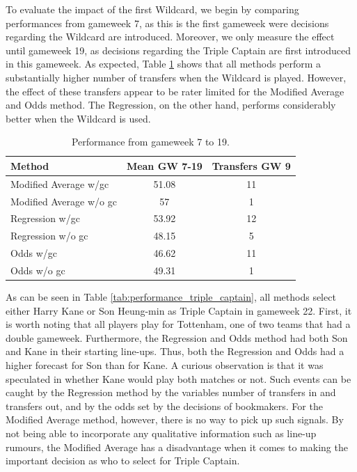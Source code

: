 To evaluate the impact of the first Wildcard,  we begin by comparing performances from gameweek 7, as this is the first gameweek were decisions regarding the Wildcard are introduced. Moreover, we only measure the effect until gameweek 19, as decisions regarding the Triple Captain are first introduced in this gameweek. As expected, Table \ref{tab:first_wildcard} shows that all methods perform a substantially higher number of transfers when the Wildcard is played. However, the effect of these transfers appear to be rater limited for the Modified Average and Odds method. The Regression, on the other hand, performs considerably better when the Wildcard is used.  

\newpar




\begin{table}[H]
\centering
\begin{tabular}{@{}lcc@{}}
\toprule
                Method  & Mean GW 7-19  & Transfers GW 9 \\ \midrule
Modified Average w/gc   & 51.08 & 11             \\
Modified Average w/o gc & 57    & 1              \\
Regression w/gc         & 53.92 & 12             \\
Regression w/o gc       & 48.15 & 5              \\
Odds w/gc               & 46.62 & 11             \\
Odds w/o gc             & 49.31 & 1              \\ \bottomrule
\end{tabular}
\caption{Performance from gameweek 7 to 19.}
\label{tab:first_wildcard}
\end{table}


As can be seen in Table \ref{tab:performance_triple_captain}, all methods select either Harry Kane or Son Heung-min as Triple Captain in gameweek 22. First, it is worth noting that all players play for Tottenham, one of two teams that had a double gameweek. Furthermore, the Regression and Odds method had both Son and Kane in their starting line-ups. Thus, both the Regression and Odds had a higher forecast for Son than for Kane. A curious observation is that it was speculated in whether Kane would play both matches or not. Such events can be caught by the Regression method by the variables number of transfers in and transfers out, and by the odds set by the decisions of bookmakers. For the Modified Average method, however, there is no way to pick up such signals. By not being able to incorporate any qualitative information such as line-up rumours, the Modified Average has a disadvantage when it comes to making the important decision as who to select for Triple Captain.

